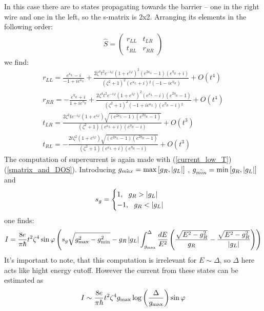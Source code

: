 In this case there are to states propagating towards the barrier -- one in the right wire and one in the left, so the s-matrix is 2x2. Arranging its elements in the following order:
\begin{gather}
\label{s_matrix_2D}
	\hat{S}
	=
	\begin{pmatrix}
	r_{LL} & t_{LR} \\ 
	t_{RL} & r_{RR}
	\end{pmatrix}
\end{gather}
we find:
\begin{gather}
	r_{LL}
	=
	\frac{e^{\kappa _L}-i}{-1+i e^{\kappa _L}}+\frac{2 \zeta ^4 t^2 e^{-i \varphi } \left(1+e^{i \varphi }\right)^2 \left(e^{2 \kappa _L}-1\right) \left(e^{\eta _R}+i\right)}{\left(\zeta ^2+1\right)^2 \left(e^{\kappa _L}+i\right){}^2 \left(-1-i e^{\eta _R}\right)}+O\left(t^4\right)
	\\
	r_{RR}
	=
	-\frac{e^{\eta _R}+i}{1+i e^{\eta _R}}
	+
	\frac{2 \zeta ^4 t^2 e^{-i \varphi } \left(1+e^{i \varphi }\right)^2 \left(e^{\kappa _L}-i\right) \left(e^{2 \eta _R}-1\right)}{\left(\zeta ^2+1\right)^2 \left(-1+i e^{\kappa _L}\right) \left(e^{\eta _R}-i\right){}^2}+O\left(t^4\right)
	\\
	t_{LR}=
	\frac{2 \zeta ^2 t e^{-i \varphi } \left(1+e^{i \varphi }\right) \sqrt{\left(e^{2 \kappa _L}-1\right) \left(e^{2 \eta _R}-1\right)}}{\left(\zeta ^2+1\right) \left(e^{\kappa _L}+i\right) \left(e^{\eta _R}-i\right)}+O\left(t^3\right)
	\\
	t_{RL}
	=
	-\frac{2 t \zeta ^2 \left(1+e^{i \varphi }\right) \sqrt{\left(e^{2 \kappa _L}-1\right) \left(e^{2 \eta _R}-1\right)}}{\left(\zeta ^2+1\right) \left(e^{\kappa _L}+i\right) \left(e^{\eta _R}-i\right)}+O\left(t^3\right)
\end{gather}
The computation of supercurrent is again made with (\ref{current_low_T}) (\ref{smatrix_and_DOS}). Introducing $g_{\mathring{max}}=\max\left[g_R,\left|g_L\right|\right]  $ , $g_{\mathring{min}}=\min\left[g_R,\left|g_L\right|\right]  $  and 
\begin{gather}
	s_g
	=
	\begin{cases}
	1,~~g_R>\left|g_L\right|
	\\
	-1,~~g_R<\left|g_L\right|
	\end{cases}
\end{gather}
one finds:
\begin{multline}
I
=
	\frac{8e}{\pi\hbar}t^2\zeta^4
	\sin \varphi
	\left(
	s_g\sqrt{g_{\mathrm{max}}^2-g_{\mathrm{min}}^2}
-
g_{R}\left|g_{L}\right|
\int_{g_{\mathrm{\mathrm{max}}}}^{\Delta}
\frac{dE}{E^2}
\left(
	\frac{\sqrt{E^2-g_{R}^2}}{g_{R}}
	-
	\frac{\sqrt{E^2-g_{R}^2}}{\left|g_{L}\right|}
\right)
	\right)
\end{multline}
It's important to note, that this computation is irrelevant for $ E\sim\Delta $, so $ \Delta $ here acts like hight energy cutoff. However the current from these states can be estimated as
\begin{gather}
\label{curr_e>g_max}
	I
	\sim
	\frac{8e}{\pi\hbar}t^2\zeta^4
	g_\mathrm{max}
	\log\left( \frac{\Delta}{g_\mathrm{max}}\right)
	\sin \varphi
\end{gather} 

